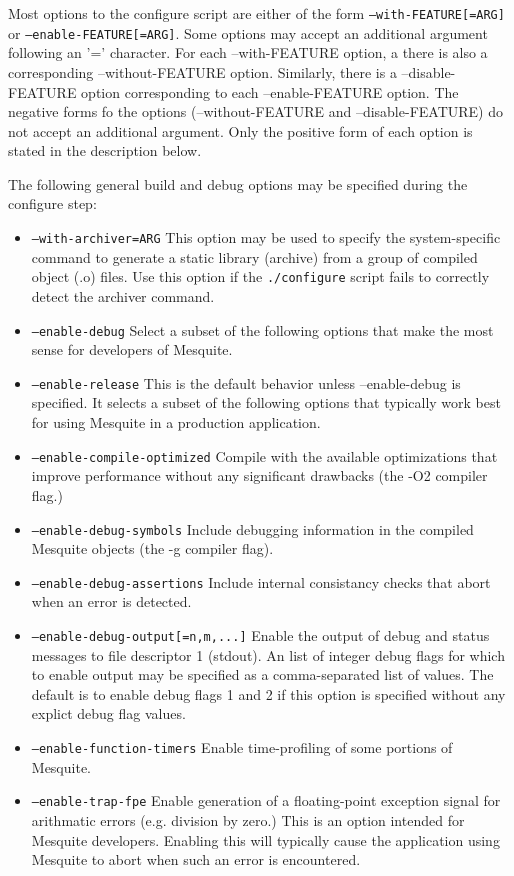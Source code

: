 Most options to the configure script are either of the form \texttt{--with-FEATURE[=ARG]} or
\texttt{--enable-FEATURE[=ARG]}.  Some options may accept an additional argument following 
an '=' character.  For each --with-FEATURE option, a there is also a corresponding
--without-FEATURE option.  Similarly, there is a --disable-FEATURE option 
corresponding to each --enable-FEATURE option.  The negative forms fo the options 
(--without-FEATURE and --disable-FEATURE) do not accept an additional argument.  
Only the positive form of each option is stated in the description below.  

\label{config_options}
The following general build and debug options may be specified during the configure step:
\begin{itemize}
\item \texttt{--with-archiver=ARG}  This option may be used to specify the
system-specific command to generate a static library (archive) from a group
of compiled object (.o) files.  Use this option if the \texttt{./configure} script fails to correctly detect the archiver command.
\item \texttt{--enable-debug}  Select a subset of the following options that
make the most sense for developers of Mesquite.
\item \texttt{--enable-release}  This is the default behavior unless 
--enable-debug is specified.  It selects a subset of the following options that
typically work best for using Mesquite in a production application.
\item \texttt{--enable-compile-optimized} Compile with the available 
optimizations that improve performance without any significant drawbacks 
(the -O2 compiler flag.)
\item \texttt{--enable-debug-symbols} Include debugging information in
the compiled Mesquite objects (the -g compiler flag).
\item \texttt{--enable-debug-assertions}  Include internal consistancy 
checks that abort when an error is detected.
\item \texttt{--enable-debug-output[=n,m,...]}  Enable the output of
debug and status messages to file descriptor 1 (stdout).  An 
list of integer debug flags for which to enable output may be specified 
as a comma-separated list of values.  The default is to enable debug
flags 1 and 2 if this option is specified without any explict debug
flag values.
\item \texttt{--enable-function-timers}  Enable time-profiling of
some portions of Mesquite.
\item \texttt{--enable-trap-fpe}  Enable generation of a floating-point
exception signal for arithmatic errors (e.g. division by zero.)  This is
an option intended for Mesquite developers.  Enabling this will typically cause
the application using Mesquite to abort when such an error is encountered.
\end{itemize}


